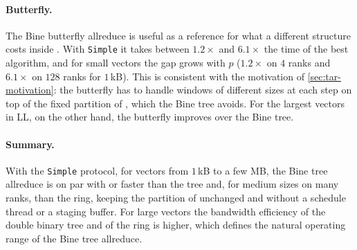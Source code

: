 \paragraph{Butterfly.}
The Bine butterfly allreduce is useful as a reference for what a different structure costs inside \nccl{}.
With \texttt{Simple} it takes between $1.2\times$ and $6.1\times$ the time of the best \nccl{} algorithm, and for small vectors the gap grows with $p$ ($1.2\times$ on $4$ ranks and $6.1\times$ on $128$ ranks for $1$\,kB).
This is consistent with the motivation of \cref{sec:tar-motivation}: the butterfly has to handle windows of different sizes at each step on top of the fixed partition of \nccl{}, which the Bine tree avoids.
For the largest vectors in LL, on the other hand, the butterfly improves over the Bine tree.
\paragraph{Summary.}
With the \texttt{Simple} protocol, for vectors from $1$\,kB to a few MB, the Bine tree allreduce is on par with or faster than the \nccl{} tree and, for medium sizes on many ranks, than the ring, keeping the partition of \nccl{} unchanged and without a schedule thread or a staging buffer.
For large vectors the bandwidth efficiency of the double binary tree and of the ring is higher, which defines the natural operating range of the Bine tree allreduce.
